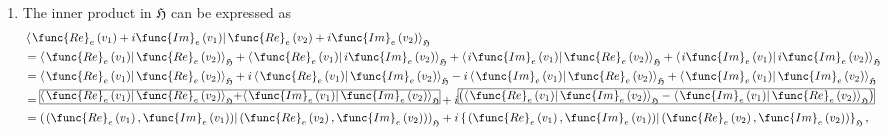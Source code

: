 \documentclass[aps,preprint]{revtex4}
\begin{document}
\begin{enumerate}
\item The inner product in $\mathfrak{H}$ can be expressed as 
\begin{align}
& \left\langle \left. \func{Re}_{e}\left( v_{1}\right) +i\func{Im}_{e}\left(
v_{1}\right) \right\vert \func{Re}_{e}\left( v_{2}\right) +i\func{Im}%
_{e}\left( v_{2}\right) \right\rangle _{\mathfrak{H}} \\
& =\left\langle \left. \func{Re}_{e}\left( v_{1}\right) \right\vert \func{Re}%
_{e}\left( v_{2}\right) \right\rangle _{\mathfrak{H}}+\left\langle \left. 
\func{Re}_{e}\left( v_{1}\right) \right\vert i\func{Im}_{e}\left(
v_{2}\right) \right\rangle _{\mathfrak{H}}+\left\langle \left. i\func{Im}%
_{e}\left( v_{1}\right) \right\vert \func{Re}_{e}\left( v_{2}\right)
\right\rangle _{\mathfrak{H}}+\left\langle \left. i\func{Im}_{e}\left(
v_{1}\right) \right\vert i\func{Im}_{e}\left( v_{2}\right) \right\rangle _{%
\mathfrak{H}} \\
& =\left\langle \left. \func{Re}_{e}\left( v_{1}\right) \right\vert \func{Re}%
_{e}\left( v_{2}\right) \right\rangle _{\mathfrak{H}}+i\left\langle \left. 
\func{Re}_{e}\left( v_{1}\right) \right\vert \func{Im}_{e}\left(
v_{2}\right) \right\rangle _{\mathfrak{H}}-i\left\langle \left. \func{Im}%
_{e}\left( v_{1}\right) \right\vert \func{Re}_{e}\left( v_{2}\right)
\right\rangle _{\mathfrak{H}}+\left\langle \left. \func{Im}_{e}\left(
v_{1}\right) \right\vert \func{Im}_{e}\left( v_{2}\right) \right\rangle _{%
\mathfrak{H}} \\
& =\frame{$\left\langle \left. \func{Re}_{e}\left( v_{1}\right) \right\vert 
\func{Re}_{e}\left( v_{2}\right) \right\rangle _{\mathfrak{H}}$+$%
\left\langle \left. \func{Im}_{e}\left( v_{1}\right) \right\vert \func{Im}%
_{e}\left( v_{2}\right) \right\rangle _{\mathfrak{H}}$}+i\frame{$\left(
\left\langle \left. \func{Re}_{e}\left( v_{1}\right) \right\vert \func{Im}%
_{e}\left( v_{2}\right) \right\rangle _{\mathfrak{H}}-\left\langle \left. 
\func{Im}_{e}\left( v_{1}\right) \right\vert \func{Re}_{e}\left(
v_{2}\right) \right\rangle _{\mathfrak{H}}\right) $} \\
& =\left( \left. \left( \func{Re}_{e}\left( v_{1}\right) ,\func{Im}%
_{e}\left( v_{1}\right) \right) \right\vert \left( \func{Re}_{e}\left(
v_{2}\right) ,\func{Im}_{e}\left( v_{2}\right) \right) \right) _{\mathfrak{H}%
}+i\left\{ \left. \left( \func{Re}_{e}\left( v_{1}\right) ,\func{Im}%
_{e}\left( v_{1}\right) \right) \right\vert \left( \func{Re}_{e}\left(
v_{2}\right) ,\func{Im}_{e}\left( v_{2}\right) \right) \right\} _{\mathfrak{H%
}},
\end{align}%

\end{enumerate}
\end{document}
